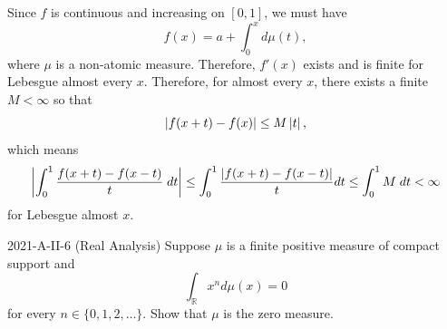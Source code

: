 \documentclass{article}
\begin{document}
\begin{solutions}
	Since $f$ is continuous and increasing on $[0,1]$, we must have 
		\begin{equation}
			f(x) = a + \int_{0}^{x}d\mu(t),
		\end{equation}
	where $\mu$ is a non-atomic measure. Therefore, $f'(x)$ exists and is finite for Lebesgue almost every $x$. Therefore, for almost every $x$, there exists a finite $M < \infty$ so that 
		\begin{equation}
			\left| f(x + t) - f(x) \right| \leq M\left| t \right|, 
		\end{equation}
	which means 
		\begin{equation}
			\left| \int_{0}^{1}\frac{f(x + t) - f(x - t)}{t}\;dt \right| \leq \int_{0}^{1}\frac{\left| f(x + t) - f(x - t) \right|}{t}dt \leq \int_{0}^{1}M\;dt < \infty
		\end{equation}
	for Lebesgue almost $x$. 
\end{solutions}
\begin{prb}{2021-A-II-6 (Real Analysis)}
	Suppose $\mu$ is a finite positive measure of compact support and 
		\begin{equation*}
			\int_{\mathbb{R}}x^{n}d\mu(x) =0
		\end{equation*}
	for every $n \in \{0,1,2,\ldots\}$. Show that $\mu$ is the zero measure. 
\end{prb}
\end{document}
